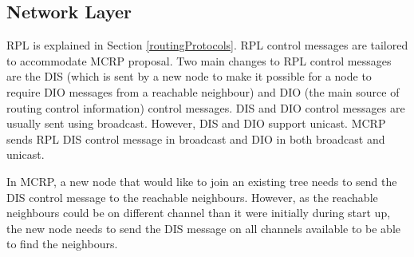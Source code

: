



\subsection{Network Layer}

RPL is explained in Section \ref{routingProtocols}. RPL control messages are tailored to accommodate MCRP proposal. Two main changes to RPL control messages are the DIS (which is sent by a new node to make it possible for a node to require DIO messages from a reachable neighbour) and DIO (the main source of routing control information) control messages. DIS and DIO control messages are usually sent using broadcast. However, DIS and DIO support unicast. MCRP sends RPL DIS control message in broadcast and DIO in both broadcast and unicast. 

In MCRP, a new node that would like to join an existing tree needs to send the DIS control message to the reachable neighbours. However, as the reachable neighbours could be on different channel than it were initially during start up, the new node needs to send the DIS message on all channels available to be able to find the neighbours. 

